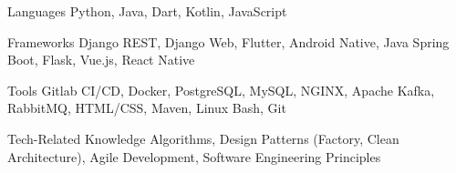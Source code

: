 
\begin{cvskills}
  \cvskill
    {Languages} %
    {Python, Java, Dart, Kotlin, JavaScript} %

  \cvskill
    {Frameworks} %
    {Django REST, Django Web, Flutter, Android Native, Java Spring Boot, Flask, Vue.js, React Native} %
    
  \cvskill
    {Tools} %
    {Gitlab CI/CD, Docker, PostgreSQL, MySQL, NGINX, Apache Kafka, RabbitMQ, HTML/CSS, Maven, Linux Bash, Git} %
    
  \cvskill
    {Tech-Related Knowledge} %
    {Algorithms, Design Patterns (Factory, Clean Architecture), Agile Development, Software Engineering Principles} %
\end{cvskills}
